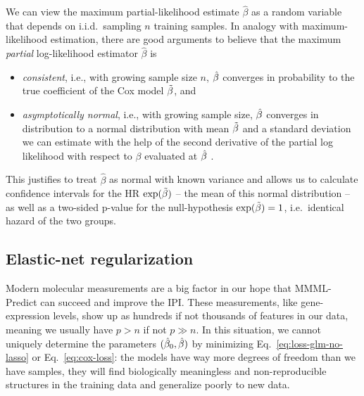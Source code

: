 We can view the maximum partial-likelihood estimate $\hat{\beta}$ as a random variable that depends 
on i.i.d.\ sampling $n$ training samples. In analogy with maximum-likelihood estimation, there are 
good arguments to believe that the maximum \textit{partial} log-likelihood estimator $\hat{\beta}$
is
\begin{itemize}  
    \item \textit{consistent}, i.e., with growing sample size $n$, $\hat{\beta}$ converges in 
        probability to the true coefficient of the Cox model $\tilde{\beta}$, and
    \item \textit{asymptotically normal}, i.e., with growing sample size, $\hat{\beta}$ converges 
        in distribution to a normal distribution with mean $\tilde{\beta}$ and a standard deviation we 
        can estimate with the help of the second derivative of the partial log likelihood with 
        respect to $\beta$ evaluated at $\hat{\beta}$ \cite[8.1--8.4]{klein03}.
\end{itemize}
This justifies to treat $\hat{\beta}$ as normal with known variance and allows us to
calculate confidence intervals for the HR $\exp(\tilde{\beta})$ -- the mean of this normal distribution -- 
as well as a two-sided p-value for the null-hypothesis $\exp(\tilde{\beta}) = 1$, i.e.\ identical hazard 
of the two groups. 

\subsection{Elastic-net regularization} \label{subsec:elastic-net}

Modern molecular measurements are a big factor in our hope that MMML-Predict can succeed and improve 
the IPI. These measurements, like gene-expression levels, show up as hundreds if not thousands of 
features in our data, meaning we usually have $p > n$ if not $p \gg n$. In this situation, we 
cannot uniquely determine the parameters $(\hat{\beta}_0, \hat{\beta})$ by minimizing 
Eq.\ \eqref{eq:loss-glm-no-lasso} or Eq.\ \eqref{eq:cox-loss}:
the models have way more degrees of freedom than we have samples, they will find biologically 
meaningless and non-reproducible structures in the training data and generalize poorly to new 
data.

